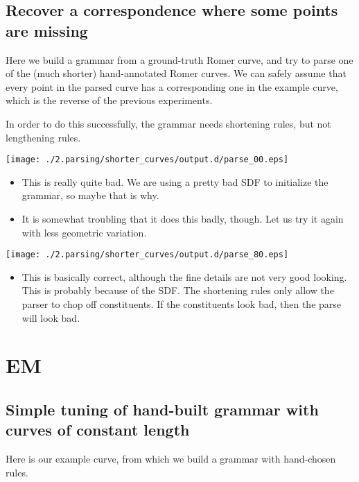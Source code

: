 \documentclass{book}
\begin{document}
\subsection{Recover a correspondence where some points are missing}
\label{sec-2_3_3}

  Here we build a grammar from a ground-truth Romer curve, and try to
  parse one of the (much shorter) hand-annotated Romer curves. We can
  safely assume that every point in the parsed curve has a
  corresponding one in the example curve, which is the reverse of the
  previous experiments.

  In order to do this successfully, the grammar needs shortening
  rules, but not lengthening rules.

\texttt{[image: ./2.parsing/shorter\_curves/output.d/parse\_00.eps]}

\begin{itemize}
\item This is really quite bad. We are using a pretty bad SDF to
    initialize the grammar, so maybe that is why.
\item It is somewhat troubling that it does this badly, though. Let us
    try it again with less geometric variation.
\end{itemize}

\texttt{[image: ./2.parsing/shorter\_curves/output.d/parse\_80.eps]}


\begin{itemize}
\item This is basically correct, although the fine details are not very
    good looking. This is probably because of the SDF. The shortening
    rules only allow the parser to chop off constituents. If the
    constituents look bad, then the parse will look bad.
\end{itemize}
\section{EM}
\label{sec-2_4}
\subsection{Simple tuning of hand-built grammar with curves of constant length}
\label{sec-2_4_1}

Here is our example curve, from which we build a grammar with hand-chosen rules.
\end{document}
